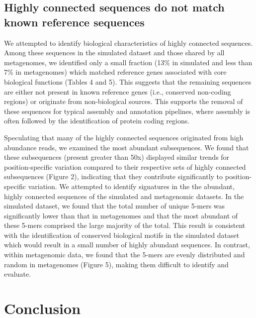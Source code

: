 \documentclass[10pt]{article}
\begin{document}
\subsection*{Highly connected sequences do not match known reference sequences}

We attempted to identify biological characteristics of highly
connected sequences.  Among these sequences in the simulated dataset
and those shared by all metagenomes, we identified only a small
fraction (13\% in simulated and less than 7\% in metagenomes) which
matched reference genes associated with core biological functions
(Tables 4 and 5).  This suggests that the remaining sequences are
either not present in known reference genes (i.e., conserved
non-coding regions) or originate from non-biological sources.  This
supports the removal of these sequences for typical assembly and
annotation pipelines, where assembly is often followed by the
identification of protein coding regions.

Speculating that many of the highly connected sequences originated
from high abundance reads, we examined the most abundant subsequences.  We found
that these subsequences (present greater than 50x) displayed similar
trends for position-specific variation compared to their respective sets
of highly connected subsequences (Figure 2), indicating that they
contribute significantly to position-specific variation.  We attempted to
identify signatures in the the abundant, highly connected sequences of
the simulated and metagenomic datasets.  In the simulated dataset, we
found that the total number of unique 5-mers was significantly lower
than that in metagenomes and that the most abundant of these 5-mers
comprised the large majority of the total.  This result is consistent
with the identification of conserved biological motifs in the
simulated dataset which would result in a small number of highly
abundant sequences.  In contrast, within metagenomic data, we found
that the 5-mers are evenly distributed and random in metagenomes
(Figure 5), making them difficult to identify and evaluate.

\section*{Conclusion}
\end{document}
